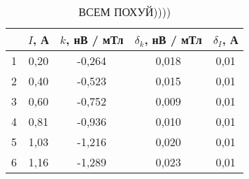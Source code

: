 \begin{table}
\centering
\caption{ВСЕМ ПОХУЙ))))}
\begin{tabular}{|c|c|c|c|c|}
\hline
 & $I$, А & $k$, нВ / мТл & $\delta_k$, нВ / мТл & $\delta_I$, А \\
\hline
1 & 0,20 & -0,264 & 0,018 & 0,01 \\
\cline{1-5}
2 & 0,40 & -0,523 & 0,015 & 0,01 \\
\cline{1-5}
3 & 0,60 & -0,752 & 0,009 & 0,01 \\
\cline{1-5}
4 & 0,81 & -0,936 & 0,010 & 0,01 \\
\cline{1-5}
5 & 1,03 & -1,216 & 0,020 & 0,01 \\
\cline{1-5}
6 & 1,16 & -1,289 & 0,023 & 0,01 \\
\cline{1-5}
\hline
\end{tabular}
\end{table}

